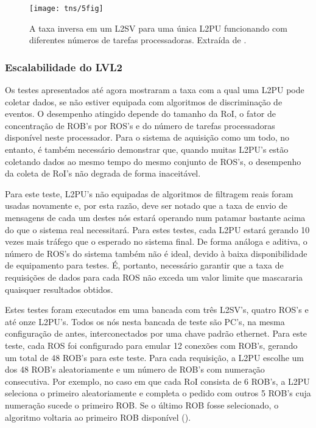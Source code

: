 \begin{figure}
\begin{center}
\texttt{[image: tns/5fig]}
\end{center}
\caption{A taxa inversa em um L2SV para uma única L2PU funcionando com
diferentes números de tarefas processadoras. Extraída de
\cite{aa:tns-2004}.}
\label{fig:tns-5fig}
\end{figure}

\subsubsection{Escalabilidade do LVL2}

Os testes apresentados até agora mostraram a taxa com a qual uma L2PU pode
coletar dados, se não estiver equipada com algoritmos de discriminação de
eventos. O desempenho atingido depende do tamanho da RoI, o fator de
concentração de ROB's por ROS's e do número de tarefas processadoras
disponível neste processador. Para o sistema de aquisição como um todo, no
entanto, é também necessário demonstrar que, quando muitas L2PU's estão
coletando dados ao mesmo tempo do mesmo conjunto de ROS's, o desempenho da
coleta de RoI's não degrada de forma inaceitável.

Para este teste, L2PU's não equipadas de algoritmos de filtragem reais foram
usadas novamente e, por esta razão, deve ser notado que a taxa de envio de
mensagens de cada um destes nós estará operando num patamar bastante acima do
que o sistema real necessitará. Para estes testes, cada L2PU estará gerando 10
vezes mais tráfego que o esperado no sistema final. De forma análoga e
aditiva, o número de ROS's do sistema também não é ideal, devido à baixa
disponibilidade de equipamento para testes. É, portanto, necessário garantir
que a taxa de requisições de dados para cada ROS não exceda um valor limite
que mascararia quaisquer resultados obtidos.

Estes testes foram executados em uma bancada com três L2SV's, quatro ROS's e
até onze L2PU's. Todos os nós nesta bancada de teste são PC's, na mesma
configuração de antes, interconectados por uma chave padrão 
ethernet. Para este teste, cada ROS foi configurado para emular 12 conexões
com ROB's, gerando um total de 48 ROB's para este teste. Para cada requisição,
a L2PU escolhe um dos 48 ROB's aleatoriamente e um número de ROB's com
numeração consecutiva. Por exemplo, no caso em que cada RoI consista de 6
ROB's, a L2PU seleciona o primeiro aleatoriamente e completa o pedido com
outros 5 ROB's cuja numeração sucede o primeiro ROB. Se o último ROB fosse
selecionado, o algoritmo voltaria ao primeiro ROB disponível
().

